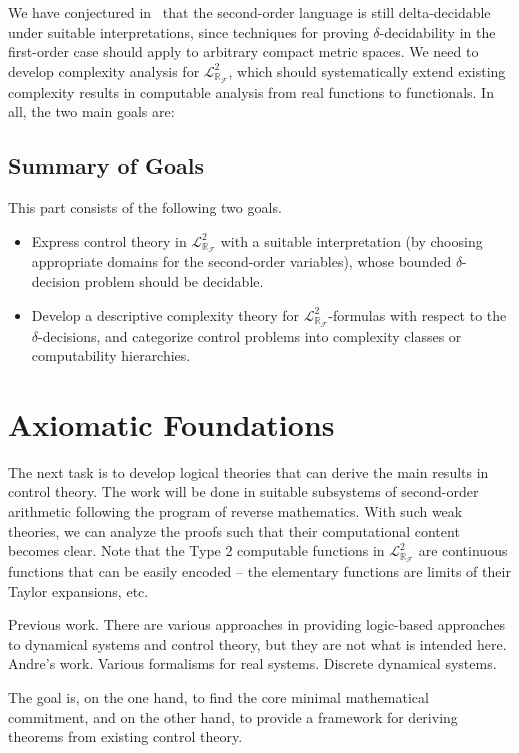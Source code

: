 \documentclass[10pt]{article}
\newcommand{\lrf}{\mathcal{L}_{\mathbb{R}_{\mathcal{F}}}}
\theoremstyle{definition}
\begin{document}
We have conjectured in~\cite{DBLP:conf/lics/GaoAC12} that the second-order language is still delta-decidable under suitable interpretations, since techniques for proving $\delta$-decidability in the first-order case should apply to arbitrary compact metric spaces. We need to develop complexity analysis for $\lrf^2$, which should systematically extend existing complexity results in computable analysis from real functions to functionals. In all, the two main goals are:

\subsection{Summary of Goals} 

This part consists of the following two goals. 
\begin{itemize}
\item Express control theory in $\mathcal{L}^2_{\mathbb{R}_{\mathcal{F}}}$ with a suitable interpretation (by choosing appropriate domains for the second-order variables), whose bounded $\delta$-decision problem should be decidable.
\item Develop a descriptive complexity theory for $\lrf^2$-formulas with respect to the $\delta$-decisions, and categorize control problems into complexity classes or computability hierarchies.
\end{itemize}


\section{Axiomatic Foundations}

The next task is to develop logical theories that can derive the main results in control theory.
The work will be done in suitable subsystems of second-order arithmetic following the program of reverse mathematics. With such weak theories, we can analyze the proofs such that their computational content becomes clear. Note that the Type 2 computable functions in  $\lrf^2$ are continuous functions that can be easily encoded -- the elementary functions are limits of their Taylor expansions, etc. 

Previous work. There are various approaches in providing logic-based approaches to dynamical systems and control theory, but they are not what is intended here. Andre's work. Various formalisms for real systems. Discrete dynamical systems. 

The goal is, on the one hand, to find the core minimal mathematical commitment, and on the other hand, to provide a framework for deriving theorems from existing control theory. 
\end{document}

